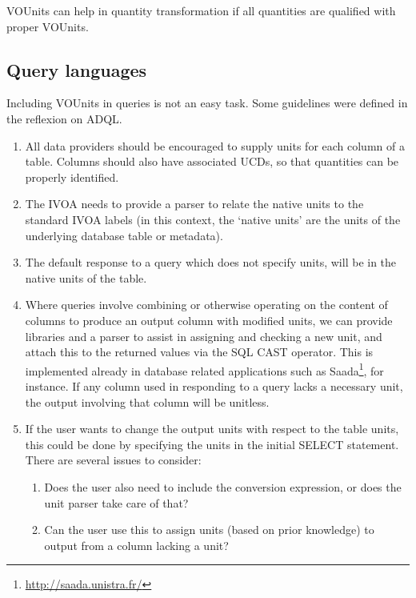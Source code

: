 \documentclass[11pt,notitlepage,onecolumn]{ivoa}
\begin{document}
VOUnits can help in quantity transformation if all quantities are qualified with proper VOUnits.

\subsection{Query languages}

Including VOUnits in queries is not an easy task. Some guidelines were defined in the
reflexion on ADQL.

\begin{enumerate}
\item All data providers should be encouraged to supply units for each column
of a table. Columns should also have associated UCDs, so that quantities can be
properly identified.

\item The IVOA needs to provide a parser to relate the native units to the standard IVOA
labels (in this context, the `native units' are the units of the
underlying database table or metadata).   

\item
The default response to a query which does not specify units, will be
in the native units of the table. 

\item
Where queries involve combining or otherwise operating on the content
of columns to produce an output column with modified units, we can
provide libraries and a parser to assist in assigning and checking a
new unit, and attach this to the returned values via the SQL CAST
operator. 
This is implemented already in database related applications such as 
Saada\footnote{\url{http://saada.unistra.fr/}}, for instance. 
If any column used in responding to a query lacks a necessary unit, the output
involving that column will be unitless.

\item
If the user wants to change the output units with respect to the table
units, this could be done by specifying the units in the initial
SELECT statement. There are several issues to consider: 
	\begin{enumerate}
	\item Does the user also need to include the conversion expression, or does the unit
parser take care of that?  
	\item Can the user use this to assign units (based on prior knowledge) to output from a 
column lacking a unit?
	\end{enumerate}
\end{enumerate} 
\end{document}
